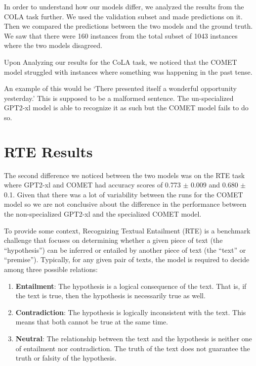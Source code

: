 \documentclass[\main/thesis.tex]{subfiles}
\begin{document}
In order to understand how our models differ, we analyzed the results from the COLA task further. 
We used the validation subset and made predictions on it. Then we compared the predictions between
the two models and the ground truth. We saw that there were 160 instances from the total 
subset of 1043 instances where the two models disagreed. 

Upon Analyzing our results for the CoLA task, we noticed that the COMET 
model struggled with instances where something was happening in the past tense.

An example of this would be `There presented itself a wonderful opportunity yesterday.' 
This is supposed to be a malformed sentence. The un-specialized GPT2-xl model is able to 
recognize it as such but the COMET model fails to do so. 

\section{RTE Results}\label{sec:rte_results}

The second difference we noticed between the two models was on the RTE task where GPT2-xl
 and COMET had accuracy scores of 0.773 $\pm$ 0.009 and 0.680 $\pm$ 0.1. Given that
there was a lot of variability between the runs for the COMET model so we are not conclusive
about the difference in the performance between the non-specialized GPT2-xl and the specialized
COMET model. 

To provide some context, Recognizing Textual Entailment (RTE) is a benchmark challenge 
that focuses on determining whether a given piece of text (the ``hypothesis'') can be inferred or 
entailed by another piece of text (the ``text'' or ``premise''). Typically, for any given pair of texts, 
the model is required to decide among three possible relations:

\begin{enumerate}
    \item \textbf{Entailment}: The hypothesis is a logical consequence of the text. That is, 
    if the text is true, then the hypothesis is necessarily true as well.
    \item \textbf{Contradiction}: The hypothesis is logically inconsistent with the text. 
    This means that both cannot be true at the same time.
    \item \textbf{Neutral}: The relationship between the text and the hypothesis is neither one of entailment nor contradiction. 
    The truth of the text does not guarantee the truth or falsity of the hypothesis.
\end{enumerate}
\end{document}
